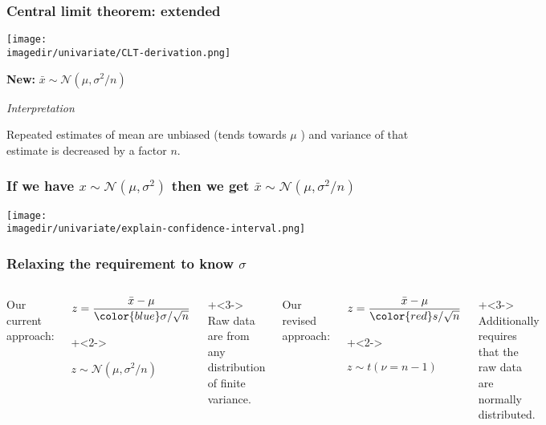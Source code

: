 \begin{frame}\frametitle{Central limit theorem: extended}

	\texttt{[image: \\imagedir/univariate/CLT-derivation.png]}

	\vspace{18pt}
	\textbf{New:} $\bar{x} \sim \mathcal{N}\left(\mu, \sigma^2/n \right)$  \hfill{\color{myGreen}{$\longleftarrow$ really powerful statement}}

	\vspace{18pt}
	\emph{Interpretation}

	Repeated estimates of mean are unbiased (tends towards $\mu$ {\color{myOrange}{$\leftarrow$ of the distribution sampled from!}}) and variance of that estimate is decreased by a factor $n$. 
	
\end{frame}

\begin{frame}\frametitle{If we have $x \sim \mathcal{N}\left(\mu, \sigma^2 \right)$ then we get $\bar{x} \sim \mathcal{N}\left(\mu, \sigma^2/n \right)$}
	\centerline{\texttt{[image: \\imagedir/univariate/explain-confidence-interval.png]}}
\end{frame}

\begin{frame}\frametitle{Relaxing the requirement to know $\sigma$}
	
	\begin{columns}[t]
			Our current approach:
			\begin{itemize}
				
				\item	$z = \dfrac{\bar{x} - \mu}{{\color{blue}\sigma} / \sqrt{n}}$
				
				\onslide+<2->{
				\vspace{10pt}
				\item	$z \sim \mathcal{N}\left(\mu, \sigma^2/n \right)$
				}
			\end{itemize}
			\onslide+<3->{
			\vspace{20pt}Raw data are from any distribution of finite variance.}
			
		\column{0.5\textwidth}
			Our revised approach:
			\begin{itemize}
				
				\item	$z = \dfrac{\bar{x} - \mu}{{\color{red}s}/ \sqrt{n}}$
				
				\onslide+<2->{
				\vspace{10pt}
				\item	$z \sim t\left(\nu=n-1 \right)$
				}
				
				
			\end{itemize}
			\onslide+<3->{
			\vspace{20pt}Additionally requires that the raw data are normally distributed.\hfill{\color{myGreen}{$\longleftarrow$  easy to verify}}}
			
	\end{columns}
\end{frame}

